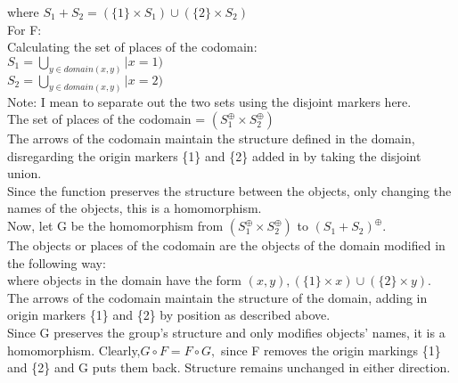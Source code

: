 where $S_1 + S_2 = (\{1\} \times S_1) \cup (\{2\} \times S_2)$\\
For F:\\
Calculating the set of places of the codomain:\\
  $S_1 =  \bigcup_{ y \in domain (x, y)} | x=1)$\\
  $S_2 =  \bigcup_{y \in domain (x, y)} | x=2)$\\
Note: I mean to separate out the two sets using the disjoint markers here.\\
The set of places of the codomain = $(S_1 ^\oplus \times S_2 ^\oplus)$\\
The arrows of the codomain maintain the structure defined in the domain, disregarding the origin markers \{1\} and \{2\} added in by taking the disjoint union.\\
Since the function preserves the structure between the objects, only changing the names of the objects, this is a homomorphism.\\
Now, let G be the homomorphism from $(S_1 ^\oplus \times S_2 ^\oplus)$ to $(S_1 + S_2)^\oplus$. \\
The objects or places of the codomain are the objects of the domain modified in the following way:\\
where objects in the domain have the form $(x, y), (\{1\} \times x) \cup (\{2\} \times y).$\\
The arrows of the codomain maintain the structure of the domain, adding in origin markers \{1\} and \{2\} by position as described above.\\
Since G preserves the group's structure and only modifies objects' names, it is a homomorphism. 
Clearly,$ G \circ F = F \circ G,$ since F removes the origin markings  \{1\} and \{2\} and G puts them back. Structure remains unchanged in either direction.\\
\newpage

